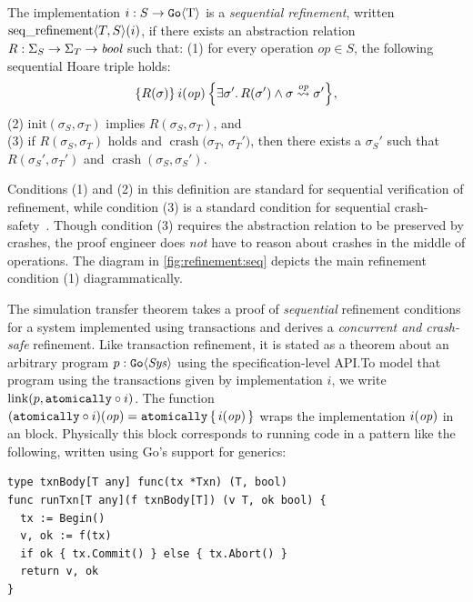\begin{definition}
  The implementation $i : S \to \mathtt{Go}\langle \mathrm{T} \rangle$ is a \emph{sequential
    refinement}, written
  $\operatorname{seq\_refinement} \langle T, S \rangle(i)$, if there exists an abstraction relation
  $R : \Sigma_{S} \to \Sigma_{T} \to \textit{bool}$ such that: \newline
(1) for every operation
  $op \in S$, the following sequential Hoare triple holds:
  \[
    \hoare{R(\sigma)}{i(\opv)}{\exists \sigma'.\, R(\sigma') \land \sigma \overset{\opv}{\leadsto} \sigma'},
  \]
(2) $\mathrm{init}(\sigma_{S}, \sigma_{T})$ implies
$R(\sigma_{S}, \sigma_{T})$, and \\
(3) if $R(\sigma_{S}, \sigma_{T})$ holds and $\operatorname{crash}(\sigma_{T}$, $\sigma_{T}')$,
then there exists a $\sigma_{S}'$ such that $R(\sigma_{S}', \sigma_{T}')$ and
$\operatorname{crash}(\sigma_{S}, \sigma_{S}')$.%
  \label{def:seqrefinement}
\end{definition}
%
Conditions (1) and (2) in this definition are standard for sequential
verification of refinement, while condition (3) is a standard condition for sequential crash-safety~\citep{chajed:argosy}. Though condition (3) requires the
abstraction relation to be preserved by crashes, the proof engineer does \emph{not} have to reason about crashes in the middle of operations.
The
diagram in \cref{fig:refinement:seq} depicts the main
refinement condition (1) diagrammatically.

The simulation transfer theorem takes a proof of \emph{sequential} refinement
conditions for a system implemented using transactions and derives a
\emph{concurrent and crash-safe} refinement. Like transaction refinement, it is
stated as a theorem about an arbitrary program $p : \mathtt{Go}\langle \mathit{Sys} \rangle$ using
the specification-level API.\@ To model that program using the transactions given
by implementation $i$, we write $\mathrm{link}(p, \mathtt{atomically}\circ i)$. The function
$(\mathtt{atomically}\circ i)(\mathit{op}) = \mathtt{atomically}\,\{\, i(\mathit{op}) \,\}$ wraps the implementation
$i(\mathit{op})$ in an  block. Physically this  block
corresponds to running code in a pattern like the following, written using Go's
support for generics:
%
\begin{verbatim}
type txnBody[T any] func(tx *Txn) (T, bool)
func runTxn[T any](f txnBody[T]) (v T, ok bool) {
  tx := Begin()
  v, ok := f(tx)
  if ok { tx.Commit() } else { tx.Abort() }
  return v, ok
}
\end{verbatim}

